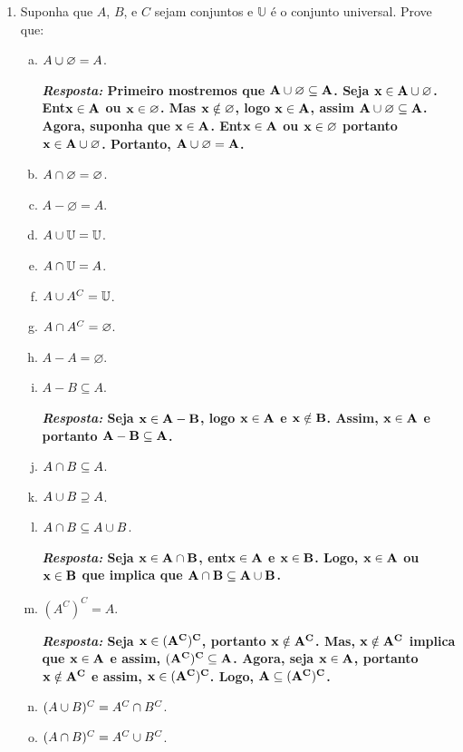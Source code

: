 \begin{enumerate}[{\bf 1.}]
\item \label{conjuntos5}Suponha que $A$, $B$, e $C$ sejam conjuntos e $\mathbb{U}$ \'e o conjunto universal. Prove que:
\begin{enumerate}[a)]
\item $A\cup\varnothing=A$.

{\bf{\it Resposta:} Primeiro mostremos que ${\bf A\cup\varnothing\subseteq A}$. Seja ${\bf x\in A\cup\varnothing}$. Ent\ao ${\bf x\in A}$ ou ${\bf x\in\varnothing}$. Mas ${\bf x\notin\varnothing}$, logo ${\bf x\in A}$, assim ${\bf A\cup\varnothing\subseteq A}$. Agora, suponha que ${\bf x\in A}$. Ent\ao ${\bf x\in A}$ ou ${\bf x\in\varnothing}$ portanto ${\bf x\in A\cup\varnothing}$. Portanto, ${\bf A\cup\varnothing =A}$.}
\item $A\cap\varnothing=\varnothing$.
\item $A-\varnothing=A$.
\item $A\cup\mathbb{U}=\mathbb{U}$.
\item $A\cap\mathbb{U}=A$.
\item $A\cup A^C=\mathbb{U}$.
\item $A\cap A^C=\varnothing$.
\item $A-A=\varnothing$.
\item $A-B\subseteq A$.

{\bf{\it Resposta:} Seja ${\bf x\in A-B}$, logo ${\bf x\in A}$ e ${\bf x\notin B}$. Assim, ${\bf x\in A}$ e portanto ${\bf A-B\subseteq A}$.}

\item $A\cap B \subseteq A$.
\item $A\cup B \supseteq A$.
\item $A\cap B\subseteq A\cup B$.

{\bf{\it Resposta:} Seja ${\bf x\in A\cap B}$, ent\ao ${\bf x\in A}$ e ${\bf x\in B}$. Logo, ${\bf x\in A}$ ou ${\bf x\in B}$ que implica que ${\bf A\cap B\subseteq A\cup B}$.}

\item $(A^C)^C=A$.

{\bf{\it Resposta:} Seja ${\bf x\in(A^C)^C}$, portanto ${\bf x\notin A^C}$. Mas, ${\bf x\notin A^C}$ implica que ${\bf x\in A}$ e assim, ${\bf (A^C)^C\subseteq A}$. Agora, seja ${\bf x\in A}$, portanto ${\bf x\notin A^C}$ e assim, ${\bf x\in(A^C)^C}$. Logo, ${\bf A\subseteq (A^C)^C}$.}

\item $(A\cup B)^C = A^C\cap B^C$.
\item $(A\cap B)^C = A^C\cup B^C$.


\end{enumerate}
\end{enumerate}
